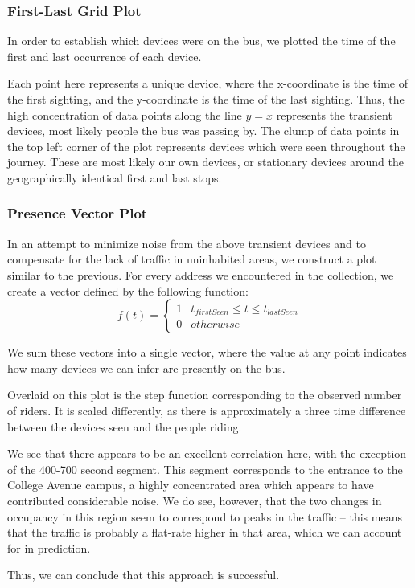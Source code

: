 \subsubsection*{First-Last Grid Plot}
In order to establish which devices were on the bus, we plotted the time of the first and last occurrence of each device.


Each point here represents a unique device, where the x-coordinate is the time of the first sighting, and the y-coordinate is the time of the last sighting.
Thus, the high concentration of data points along the line \(y=x\) represents the transient devices, most likely people the bus was passing by.
The clump of data points in the top left corner of the plot represents devices which were seen throughout the journey.
These are most likely our own devices, or stationary devices around the geographically identical first and last stops.

\subsubsection*{Presence Vector Plot}
In an attempt to minimize noise from the above transient devices and to compensate for the lack of traffic in uninhabited areas, we construct a plot similar to the previous. %
For every address we encountered in the collection, we create a vector defined by the following function:
\begin{equation*}
  f(t) = \begin{cases}
    1 & t_{firstSeen} \le t \le t_{lastSeen}\\
    0 & otherwise
  \end{cases}
\end{equation*}

We sum these vectors into a single vector, where the value at any point indicates how many devices we can infer are presently on the bus.


Overlaid on this plot is the step function corresponding to the observed number of riders.
It is scaled differently, as there is approximately a three time difference between the devices seen and the people riding.

We see that there appears to be an excellent correlation here, with the exception of the 400-700 second segment. %
This segment corresponds to the entrance to the College Avenue campus, a highly concentrated area which appears to have contributed considerable noise.
We do see, however, that the two changes in occupancy in this region seem to correspond to peaks in the traffic -- this means that the traffic is probably a flat-rate higher in that area, which we can account for in prediction.
		
Thus, we can conclude that this approach is successful. %

\clearpage
